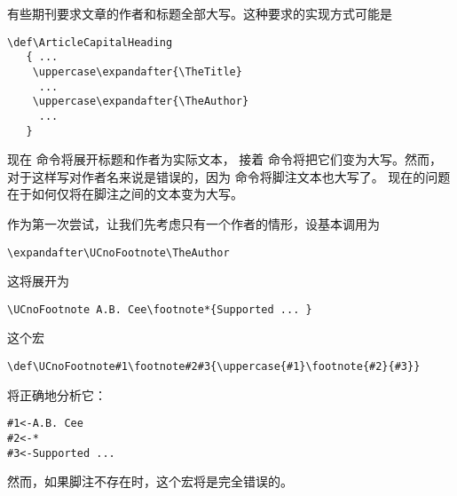 \documentclass[letterpaper]{book}
\begin{document}
有些期刊要求文章的作者和标题全部大写。这种要求的实现方式可能是
\begin{verbatim}
\def\ArticleCapitalHeading
   { ...
    \uppercase\expandafter{\TheTitle}
     ...
    \uppercase\expandafter{\TheAuthor}
     ...
   }
\end{verbatim}
现在  命令将展开标题和作者为实际文本，
接着  命令将把它们变为大写。然而，
对于这样写对作者名来说是错误的，因为  命令将脚注文本也大写了。
现在的问题在于如何仅将在脚注之间的文本变为大写。

作为第一次尝试，让我们先考虑只有一个作者的情形，设基本调用为
\begin{verbatim}
\expandafter\UCnoFootnote\TheAuthor
\end{verbatim}
这将展开为
\begin{verbatim}
\UCnoFootnote A.B. Cee\footnote*{Supported ... }
\end{verbatim}
这个宏
\begin{verbatim}
\def\UCnoFootnote#1\footnote#2#3{\uppercase{#1}\footnote{#2}{#3}}
\end{verbatim}
将正确地分析它：
\begin{verbatim}
#1<-A.B. Cee
#2<-*
#3<-Supported ...
\end{verbatim}
然而，如果脚注不存在时，这个宏将是完全错误的。
\end{document}
